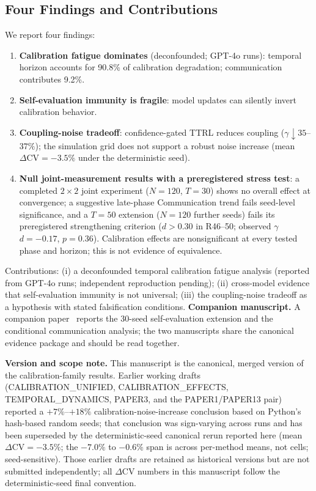 \documentclass[11pt]{article}
\newcommand{\CV}{\ensuremath{\mathrm{CV}}}
\theoremstyle{definition}
\theoremstyle{remark}
\begin{document}
\subsection{Four Findings and Contributions}

We report four findings:
\begin{enumerate}[leftmargin=*,nosep]
    \item \textbf{Calibration fatigue dominates} (deconfounded; GPT-4o runs): temporal horizon accounts for 90.8\% of calibration degradation; communication contributes 9.2\%.
    \item \textbf{Self-evaluation immunity is fragile}: model updates can silently invert calibration behavior.
    \item \textbf{Coupling-noise tradeoff}: confidence-gated TTRL reduces coupling ($\gamma \downarrow 35$--$37\%$); the simulation grid does not support a robust noise increase (mean $\Delta\CV = -3.5\%$ under the deterministic seed).
    \item \textbf{Null joint-measurement results with a preregistered stress test}: a completed $2 \times 2$ joint experiment ($N{=}120$, $T{=}30$) shows no overall effect at convergence; a suggestive late-phase Communication trend fails seed-level significance, and a $T{=}50$ extension ($N{=}120$ further seeds) fails its preregistered strengthening criterion ($d > 0.30$ in R46--50; observed $\gamma$ $d{=}-0.17$, $p{=}0.36$). Calibration effects are nonsignificant at every tested phase and horizon; this is not evidence of equivalence.
\end{enumerate}

\noindent Contributions: (i) a deconfounded temporal calibration fatigue analysis (reported from GPT-4o runs; independent reproduction pending); (ii) cross-model evidence that self-evaluation immunity is not universal; (iii) the coupling-noise tradeoff as a hypothesis with stated falsification conditions. \textbf{Companion manuscript.} A companion paper~\citep{companion2026} reports the 30-seed self-evaluation extension and the conditional communication analysis; the two manuscripts share the canonical evidence package and should be read together.

\textbf{Version and scope note.} This manuscript is the canonical, merged version of the calibration-family results. Earlier working drafts (CALIBRATION\_UNIFIED, CALIBRATION\_EFFECTS, TEMPORAL\_DYNAMICS, PAPER3, and the PAPER1/PAPER13 pair) reported a $+7\%$--$+18\%$ calibration-noise-increase conclusion based on Python's hash-based random seeds; that conclusion was sign-varying across runs and has been superseded by the deterministic-seed canonical rerun reported here (mean $\Delta\CV = -3.5\%$; the $-7.0\%$ to $-0.6\%$ span is across per-method means, not cells; seed-sensitive). Those earlier drafts are retained as historical versions but are not submitted independently; all $\Delta\CV$ numbers in this manuscript follow the deterministic-seed final convention.
\end{document}
